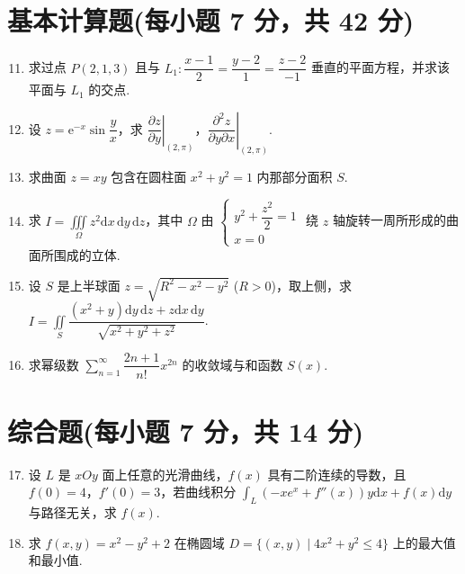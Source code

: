 \documentclass[../Main.tex]{subfiles}
\begin{document}
\section{基本计算题(每小题 7 分，共 42 分)}
\begin{enumerate}
  \setcounter{enumi}{10}
  \item 求过点 \( P(2,1,3) \) 且与 \( L_1: \dfrac{x-1}{2} = \dfrac{y-2}{1} = \dfrac{z-2}{-1} \) 垂直的平面方程，并求该平面与 \( L_1 \) 的交点.
        \vspace{9em}

  \item 设 \( z = \mathrm{e}^{-x} \sin \dfrac{y}{x} \)，求 \( \left. \dfrac{\partial z}{\partial y} \right|_{(2,\pi)} \)，\( \left. \dfrac{\partial^2 z}{\partial y \partial x} \right|_{(2,\pi)} \).
        \vspace{9em}

  \item 求曲面 \( z = xy \) 包含在圆柱面 \( x^2 + y^2 = 1 \) 内那部分面积 \( S \).
        \vspace{9em}
  \item 求 \( I = \displaystyle \iiint \limits_{\Omega} z^2 \mathrm{d}x\,\mathrm{d}y\,\mathrm{d}z \)，其中 \( \Omega \) 由 \( \begin{cases} y^2 + \dfrac{z^2}{2} = 1 \\ x = 0 \end{cases} \) 绕 \( z \) 轴旋转一周所形成的曲面所围成的立体.
        \vspace{9em}

  \item 设 \( S \) 是上半球面 \( z = \sqrt{R^2 - x^2 - y^2} \) (\( R > 0 \))，取上侧，求 \( I = \displaystyle \iint \limits_S \dfrac{(x^2 + y) \mathrm{d}y\,\mathrm{d}z + z \mathrm{d}x\,\mathrm{d}y}{\sqrt{x^2 + y^2 + z^2}} \).
        \vspace{9em}

  \item 求幂级数 \( \sum \limits_{n=1}^{\infty} \dfrac{2n + 1}{n!} x^{2n} \) 的收敛域与和函数 \( S(x) \).
        \vspace{9em}
\end{enumerate}

\section{综合题(每小题 7 分，共 14 分)}

\begin{enumerate}
  \setcounter{enumi}{16}
  \item 设 \( L \) 是 \( xOy \) 面上任意的光滑曲线，\( f(x) \) 具有二阶连续的导数，且 \( f(0) = 4 \)，\( f'(0) = 3 \)，若曲线积分 \( \displaystyle\int_L (-xe^{x} + f''(x))y \mathrm{d}x + f(x) \mathrm{d}y \) 与路径无关，求 \( f(x) \).
        \vspace{11em}

  \item 求 \( f(x, y) = x^2 - y^2 + 2 \) 在椭圆域 \( D = \{(x, y) \mid 4x^2 + y^2 \leq 4\} \) 上的最大值和最小值.
        \vspace{11em}
\end{enumerate}
\end{document}
